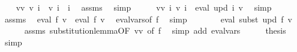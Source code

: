 \begin{isabellebody}
\ \ \isamarkupfalse%
\ v{\isacharprime}{\kern0pt}{\isacharunderscore}{\kern0pt}v{\isacharprime}{\kern0pt}{\isacharprime}{\kern0pt}{\isacharcolon}{\kern0pt}\ {\isachardoublequoteopen}{\isacharquery}{\kern0pt}v{\isacharprime}{\kern0pt}\ i\ {\isacharequal}{\kern0pt}\ {\isacharquery}{\kern0pt}v{\isacharprime}{\kern0pt}{\isacharprime}{\kern0pt}\ i{\isachardoublequoteclose}\ \ i\ \isamarkupfalse%
\ assms\ \isamarkupfalse%
\ simp\isanewline
\ \ \isamarkupfalse%
\ \isamarkupfalse%
\ v{\isacharunderscore}{\kern0pt}v{\isacharprime}{\kern0pt}{\isacharprime}{\kern0pt}{\isacharcolon}{\kern0pt}\ {\isachardoublequoteopen}{\isasymforall}i{\isachardot}{\kern0pt}\ {\isacharquery}{\kern0pt}v{\isacharprime}{\kern0pt}{\isacharprime}{\kern0pt}\ i\ {\isacharequal}{\kern0pt}\ eval\ {\isacharparenleft}{\kern0pt}upd\ i{\isacharparenright}{\kern0pt}\ v{\isachardoublequoteclose}\ \isamarkupfalse%
\ simp\isanewline
\ \ \isamarkupfalse%
\ assms\ \isamarkupfalse%
\ {\isachardoublequoteopen}eval\ f\ v\ {\isacharequal}{\kern0pt}\ eval\ f\ {\isacharquery}{\kern0pt}v{\isacharprime}{\kern0pt}{\isachardoublequoteclose}\ \isamarkupfalse%
\ eval{\isacharunderscore}{\kern0pt}vars{\isacharbrackleft}{\kern0pt}of\ f{\isacharbrackright}{\kern0pt}\ \isamarkupfalse%
\ simp\isanewline
\ \ \isamarkupfalse%
\ \isamarkupfalse%
\ {\isachardoublequoteopen}{\isasymdots}\ {\isacharequal}{\kern0pt}\ eval\ {\isacharparenleft}{\kern0pt}subst\ upd\ f{\isacharparenright}{\kern0pt}\ v{\isachardoublequoteclose}\isanewline
\ \ \ \ \isamarkupfalse%
\ assms\ substitution{\isacharunderscore}{\kern0pt}lemma{\isacharbrackleft}{\kern0pt}OF\ v{\isacharunderscore}{\kern0pt}v{\isacharprime}{\kern0pt}{\isacharprime}{\kern0pt}{\isacharcomma}{\kern0pt}\ of\ f{\isacharbrackright}{\kern0pt}\ \isamarkupfalse%
\ {\isacharparenleft}{\kern0pt}simp\ add{\isacharcolon}{\kern0pt}\ eval{\isacharunderscore}{\kern0pt}vars{\isacharparenright}{\kern0pt}\isanewline
\ \ \isamarkupfalse%
\ \isamarkupfalse%
\ {\isacharquery}{\kern0pt}thesis\ \isamarkupfalse%
\ simp\isanewline
{}\isamarkupfalse%
%
\endisatagproof
{\isafoldproof}%
%
\isadelimproof
%
\endisadelimproof
%
\isadelimdocument
%
\endisadelimdocument
%
\isatagdocument
%
\isamarkuptrue%

\end{isabellebody}

